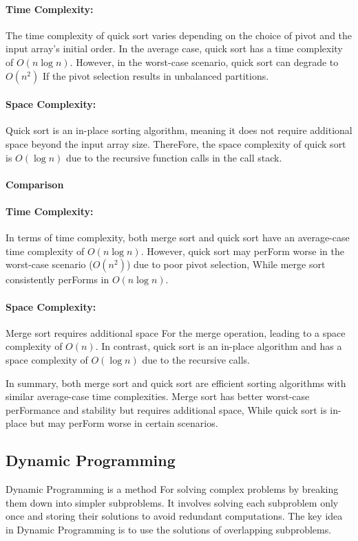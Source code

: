 \documentclass[12pt]{book} %
\begin{document}
\paragraph{Time Complexity:}
The time complexity of quick sort varies depending on the choice of pivot and the input array's initial order. In the average case, quick sort has a time complexity of \(O(n \log n)\). However, in the worst-case scenario, quick sort can degrade to \(O(n^2)\) If the pivot selection results in unbalanced partitions.

\paragraph{Space Complexity:}
Quick sort is an in-place sorting algorithm, meaning it does not require additional space beyond the input array size. ThereFore, the space complexity of quick sort is \(O(\log n)\) due to the recursive function calls in the call stack.

\paragraph{Comparison}

\paragraph{Time Complexity:}
In terms of time complexity, both merge sort and quick sort have an average-case time complexity of \(O(n \log n)\). However, quick sort may perForm worse in the worst-case scenario (\(O(n^2)\)) due to poor pivot selection, While merge sort consistently perForms in \(O(n \log n)\).

\paragraph{Space Complexity:}
Merge sort requires additional space For the merge operation, leading to a space complexity of \(O(n)\). In contrast, quick sort is an in-place algorithm and has a space complexity of \(O(\log n)\) due to the recursive calls.

In summary, both merge sort and quick sort are efficient sorting algorithms with similar average-case time complexities. Merge sort has better worst-case perFormance and stability but requires additional space, While quick sort is in-place but may perForm worse in certain scenarios.


\subsection{Dynamic Programming}
Dynamic Programming is a method For solving complex problems by breaking them down into simpler subproblems. It involves solving each subproblem only once and storing their solutions to avoid redundant computations. The key idea in Dynamic Programming is to use the solutions of overlapping subproblems.
\end{document}
